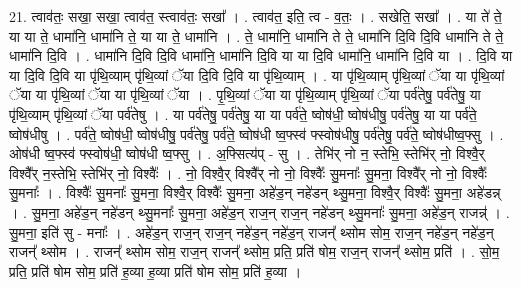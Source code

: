 \documentclass[17pt]{extarticle}
\begin{document}
21. त्वाव॑तः॒ सखा॒ सखा॒ त्वाव॑त॒ स्त्वाव॑तः॒ सखा᳚ । . त्वाव॑त॒ इति॒ त्व - व॒तः॒ । . सखेति॒ सखा᳚ । . या ते॑ ते॒ या या ते॒ धामा॑नि॒ धामा॑नि ते॒ या या ते॒ धामा॑नि । . ते॒ धामा॑नि॒ धामा॑नि ते ते॒ धामा॑नि दि॒वि दि॒वि धामा॑नि ते ते॒ धामा॑नि दि॒वि । . धामा॑नि दि॒वि दि॒वि धामा॑नि॒ धामा॑नि दि॒वि या या दि॒वि धामा॑नि॒ धामा॑नि दि॒वि या । . दि॒वि या या दि॒वि दि॒वि या पृ॑थि॒व्याम् पृ॑थि॒व्यां ॅया दि॒वि दि॒वि या पृ॑थि॒व्याम् । . या पृ॑थि॒व्याम् पृ॑थि॒व्यां ॅया या पृ॑थि॒व्यां ॅया या पृ॑थि॒व्यां ॅया या पृ॑थि॒व्यां ॅया । . पृ॒थि॒व्यां ॅया या पृ॑थि॒व्याम् पृ॑थि॒व्यां ॅया पर्व॑तेषु॒ पर्व॑तेषु॒ या पृ॑थि॒व्याम् पृ॑थि॒व्यां ॅया पर्व॑तेषु । . या पर्व॑तेषु॒ पर्व॑तेषु॒ या या पर्व॑ते॒ ष्वोष॑धी॒ ष्वोष॑धीषु॒ पर्व॑तेषु॒ या या पर्व॑ते॒ ष्वोष॑धीषु । . पर्व॑ते॒ ष्वोष॑धी॒ ष्वोष॑धीषु॒ पर्व॑तेषु॒ पर्व॑ते॒ ष्वोष॑धी ष्व॒फ्स्व॑ फ्स्वोष॑धीषु॒ पर्व॑तेषु॒ पर्व॑ते॒ ष्वोष॑धीष्व॒फ्सु । . ओष॑धी ष्व॒फ्स्व॑ फ्स्वोष॑धी॒ ष्वोष॑धी ष्व॒फ्सु । . अ॒फ्सित्य॑प् - सु । . तेभि॑र् नो न॒ स्तेभि॒ स्तेभि॑र् नो॒ विश्वै॒र् विश्वै᳚र् न॒स्तेभि॒ स्तेभि॑र् नो॒ विश्वैः᳚ । . नो॒ विश्वै॒र् विश्वै᳚र् नो नो॒ विश्वैः᳚ सु॒मनाः᳚ सु॒मना॒ विश्वै᳚र् नो नो॒ विश्वैः᳚ सु॒मनाः᳚ । . विश्वैः᳚ सु॒मनाः᳚ सु॒मना॒ विश्वै॒र् विश्वैः᳚ सु॒मना॒ अहे॑ड॒न् नहे॑डन् थ्सु॒मना॒ विश्वै॒र् विश्वैः᳚ सु॒मना॒ अहे॑डन्न् । . सु॒मना॒ अहे॑ड॒न् नहे॑डन् थ्सु॒मनाः᳚ सु॒मना॒ अहे॑ड॒न् राज॒न् राज॒न् नहे॑डन् थ्सु॒मनाः᳚ सु॒मना॒ अहे॑ड॒न् राजन्न्॑ । . सु॒मना॒ इति॑ सु - मनाः᳚ । . अहे॑ड॒न् राज॒न् राज॒न् नहे॑ड॒न् नहे॑ड॒न् राजन्᳚ थ्सोम सोम॒ राज॒न् नहे॑ड॒न् नहे॑ड॒न् राजन्᳚ थ्सोम । . राजन्᳚ थ्सोम सोम॒ राज॒न् राजन्᳚ थ्सोम॒ प्रति॒ प्रति॑ षोम॒ राज॒न् राजन्᳚ थ्सोम॒ प्रति॑ । . सो॒म॒ प्रति॒ प्रति॑ षोम सोम॒ प्रति॑ ह॒व्या ह॒व्या प्रति॑ षोम सोम॒ प्रति॑ ह॒व्या । \newline
\end{document}
